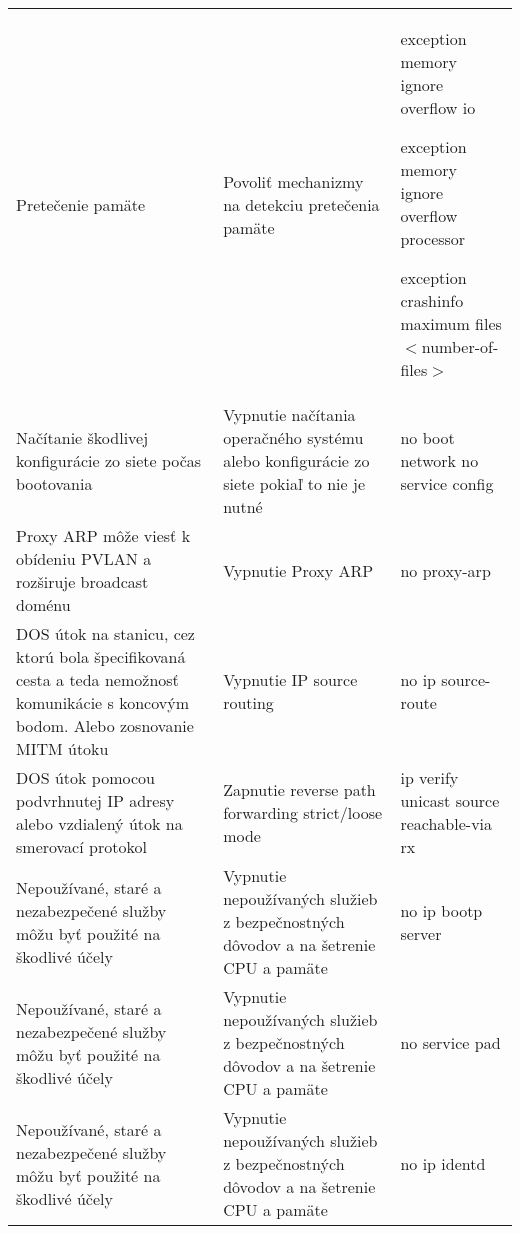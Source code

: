 \begin{longtable}[!htbp]{|L{10em}L{10em}>{\selectfont}L{34em}|}
	Pretečenie pamäte	&Povoliť mechanizmy na detekciu pretečenia pamäte	&exception memory ignore overflow io
	
	exception memory ignore overflow processor
	
	exception crashinfo maximum files $<$number-of-files$>$\\
	
	
	
	
	Načítanie škodlivej konfigurácie zo siete počas bootovania	&Vypnutie načítania operačného systému alebo konfigurácie zo siete pokiaľ to nie je nutné	&no boot network
	no service config\\
	
	
	
	
	Proxy ARP môže viesť k obídeniu PVLAN a rozširuje broadcast doménu	&Vypnutie Proxy ARP	&no proxy-arp\\
	
	
	
	DOS útok na stanicu, cez ktorú bola špecifikovaná cesta a teda nemožnosť komunikácie s koncovým bodom. Alebo zosnovanie MITM útoku	&Vypnutie IP source routing	&no ip source-route\\
	
	
	
	
	DOS útok pomocou podvrhnutej IP adresy alebo vzdialený útok na smerovací protokol	&Zapnutie reverse path forwarding strict/loose mode	&ip verify unicast source reachable-via rx\\
	
	
	
	 Nepoužívané, staré a nezabezpečené služby môžu byť použité na škodlivé účely	&Vypnutie nepoužívaných služieb z bezpečnostných dôvodov a na šetrenie CPU a pamäte 	&no ip bootp server\\
	
	
	
	
	Nepoužívané, staré a nezabezpečené služby môžu byť použité na škodlivé účely	&Vypnutie nepoužívaných služieb z bezpečnostných dôvodov a na šetrenie CPU a pamäte 	&no service pad\\
	
	
	
	
	 Nepoužívané, staré a nezabezpečené služby môžu byť použité na škodlivé účely	&Vypnutie nepoužívaných služieb z bezpečnostných dôvodov a na šetrenie CPU a pamäte 	&no ip identd\\
	
	
	

\end{longtable}
